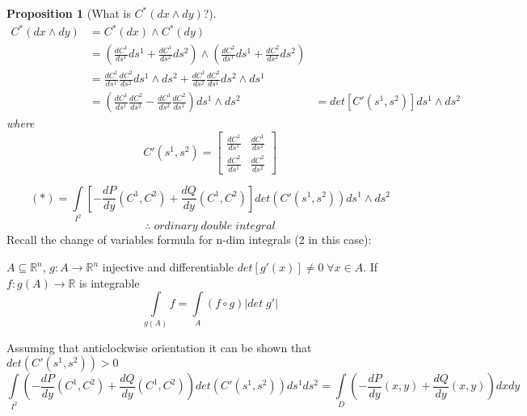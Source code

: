 \documentclass[11pt]{article}
\def\RR{\mathbb{R}}
\newtheorem{proposition}{Proposition}[section]
\begin{document}
\begin{framed} 
\begin{proposition}[What is $C^*(dx \wedge dy)$?]
\begin{align*}
C^*(dx \wedge dy) &= C^*(dx) \wedge C^*( dy)\\
&=(\tfrac{dC^1}{ds^1}ds^1 + \tfrac{dC^1}{ds^2}ds^2) \wedge (\tfrac{dC^2}{ds^1}ds^1 + \tfrac{dC^2}{ds^2}ds^2)\\
&= \tfrac{dC^1}{ds^1}\tfrac{dC^2}{ds^2}ds^1 \wedge ds^2 + \tfrac{dC^1}{ds^2}\tfrac{dC^2}{ds^1}ds^2 \wedge ds^1 \\
&= \left(\tfrac{dC^1}{ds^1}\tfrac{dC^2}{ds^2} - \tfrac{dC^1}{ds^2}\tfrac{dC^2}{ds^1} \right)ds^1 \wedge ds^2
&= det\left[C'(s^1,s^2)\right]ds^1 \wedge ds^2
\end{align*}
where 
\[C'(s^1,s^2) = \begin{bmatrix} \tfrac{dC^1}{ds^1} & \tfrac{dC^1}{ds^2} \\ \tfrac{dC^2}{ds^1} & \tfrac{dC^2}{ds^2} \end{bmatrix}\]
\end{proposition}
\end{framed}
\[(*) = \int\limits_{I^2} \left[ - \frac{dP}{dy}(C^1, C^2)+ \frac{dQ}{dy}(C^1, C^2) \right]  det\left(C'(s^1,s^2)\right)ds^1 \wedge ds^2\]
\[\therefore \; ordinary \;double \; integral\]
Recall the change of variables formula for n-dim integrals (2 in this case):\\
\begin{framed}
$A \subseteq \RR^n$, $g:A\rightarrow \RR^n$ injective and differentiable $det[g'(x)] \neq 0 \; \forall x \in A$. If $f:g(A) \rightarrow \RR$ is integrable 
\[\int\limits_{g(A)} f = \int\limits_{A} (f \circ g) |det\;g'|\]
\end{framed}
Assuming that anticlockwise orientation it can be shown that $det(C'(s^1,s^2)) >0$
\[\int\limits_{I^2} \left( - \frac{dP}{dy}(C^1, C^2)+ \frac{dQ}{dy}(C^1, C^2) \right)  det\left(C'(s^1,s^2)\right)ds^1 ds^2 = \int\limits_{D} \left( - \frac{dP}{dy}(x, y)+ \frac{dQ}{dy}(x,y) \right) dx dy\]
\end{document}
